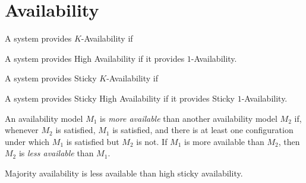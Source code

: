 
\section{Availability}

\begin{definition}[$K$-Availability]
A system provides $K$-Availability if
\end{definition}

\begin{definition}
A system provides High Availability if it provides $1$-Availability.
\end{definition}

\begin{definition}
A system provides Sticky $K$-Availability if 
\end{definition}

\begin{definition}
A system provides Sticky High Availability if it provides Sticky
$1$-Availability.
\end{definition}

\begin{definition}
An availability model $M_1$ is \textit{more available} than another
availability model $M_2$ if, whenever $M_2$ is satisfied, $M_1$ is
satisfied, and there is at least one configuration under which $M_1$
is satisfied but $M_2$ is not. If $M_1$ is more available than $M_2$,
then $M_2$ is \textit{less available} than $M_1$.
\end{definition}

\begin{observation}
Majority availability is less available than high sticky availability.
\end{observation}

